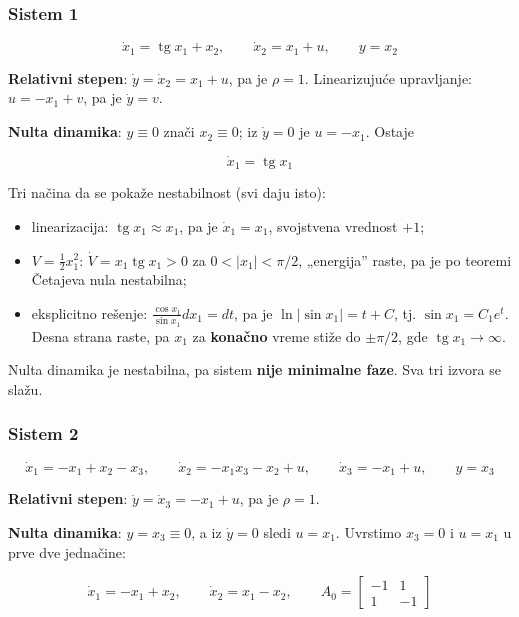 \documentclass[11pt,a4paper,parskip=half,headsepline,numbers=noenddot]{scrartcl}
\begin{document}
\subsubsection{Sistem 1}

\[\dot x_1 = \operatorname{tg}x_1 + x_2, \qquad \dot x_2 = x_1 + u, \qquad y = x_2\]

\textbf{Relativni stepen}: \(\dot y = \dot x_2 = x_1 + u\), pa je \(\rho = 1\). Linearizujuće upravljanje: \(u = -x_1 + v\), pa je \(\dot y = v\).

\textbf{Nulta dinamika}: \(y \equiv 0\) znači \(x_2 \equiv 0\); iz \(\dot y = 0\) je \(u = -x_1\). Ostaje

\[\dot x_1 = \operatorname{tg}x_1\]

Tri načina da se pokaže nestabilnost (svi daju isto):

\begin{itemize}
\item linearizacija: \(\operatorname{tg}x_1 \approx x_1\), pa je \(\dot x_1 = x_1\), svojstvena vrednost \(+1\);
\item \(V = \frac12x_1^2\): \(\dot V = x_1\operatorname{tg}x_1 > 0\) za \(0 < |x_1| < \pi/2\), „energija'' raste, pa je po teoremi Četajeva nula nestabilna;
\item eksplicitno rešenje: \(\frac{\cos x_1}{\sin x_1}dx_1 = dt\), pa je \(\ln|\sin x_1| = t + C\), tj. \(\sin x_1 = C_1e^t\). Desna strana raste, pa \(x_1\) za \textbf{konačno} vreme stiže do \(\pm\pi/2\), gde \(\operatorname{tg}x_1 \to \infty\).
\end{itemize}

Nulta dinamika je nestabilna, pa sistem \textbf{nije minimalne faze}. Sva tri izvora se slažu.

\subsubsection{Sistem 2}

\[\dot x_1 = -x_1 + x_2 - x_3, \qquad \dot x_2 = -x_1x_3 - x_2 + u, \qquad \dot x_3 = -x_1 + u, \qquad y = x_3\]

\textbf{Relativni stepen}: \(\dot y = \dot x_3 = -x_1 + u\), pa je \(\rho = 1\).

\textbf{Nulta dinamika}: \(y = x_3 \equiv 0\), a iz \(\dot y = 0\) sledi \(u = x_1\). Uvrstimo \(x_3 = 0\) i \(u = x_1\) u prve dve jednačine:

\[\dot x_1 = -x_1 + x_2, \qquad \dot x_2 = x_1 - x_2, \qquad A_0 = \begin{bmatrix} -1 & 1 \\ 1 & -1 \end{bmatrix}\]
\end{document}
